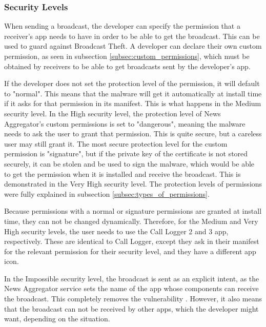     \subsubsection{Security Levels}
        \label{subsubsec:broadcast_theft_security_levels}
    
    When sending a broadcast, the developer can specify the permission that a receiver's app needs to have in order to be able to get the broadcast. This can be used to guard against Broadcast Theft. A developer can declare their own custom permission, as seen in subsection \ref{subsec:custom_permissions}, which must be obtained by receivers to be able to get broadcasts sent by the developer's app. 
    
    If the developer does not set the protection level of the permission, it will default to "normal". This means that the malware will get it automatically at install time if it asks for that permission in its manifest. This is what happens in the Medium security level. In the High security level, the protection level of News Aggregator's custom permissions is set to "dangerous", meaning the malware needs to ask the user to grant that permission. This is quite secure, but a careless user may still grant it. The most secure protection level for the custom permission is "signature", but if the private key of the certificate is not stored securely, it can be stolen and be used to sign the malware, which would be able to get the permission when it is installed and receive the broadcast. This is demonstrated in the Very High security level. The protection levels of permissions were fully explained in subsection \ref{subsec:types_of_permissions}.
    
    Because permissions with a normal or signature permissions are granted at install time, they can not be changed dynamically. Therefore, for the Medium and Very High security levels, the user needs to use the Call Logger 2 and 3 app, respectively. These are identical to Call Logger, except they ask in their manifest for the relevant permission for their security level, and they have a different app icon.
    
    In the Impossible security level, the broadcast is sent as an explicit intent, as the News Aggregator service sets the name of the app whose components can receive the broadcast. This completely removes the vulnerability \cite{2010_icc_paper}. However, it also means that the broadcast can not be received by other apps, which the developer might want, depending on the situation.
    
